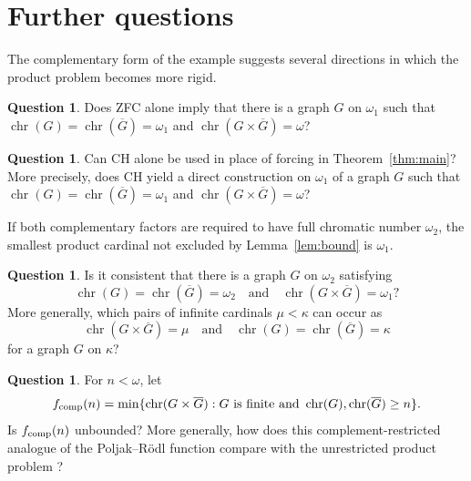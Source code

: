 \documentclass[10pt,a4paper]{amsart}
\numberwithin{equation}{section}
\theoremstyle{definition}
\newtheorem{question}[theorem]{Question}
\theoremstyle{remark}
\newcommand{\chr}{\operatorname{chr}}
\begin{document}
\iffalse
\section{Further questions}

The complementary form of the example suggests several directions in
which the product problem becomes more rigid.

\begin{question}
Does ZFC alone imply that there is a graph $G$ on $\omega_1$ such that
$\chr(G)=\chr(\overline G)=\omega_1$ and
$\chr(G\times\overline G)=\omega$?
\end{question}

\begin{question}
Can CH alone be used in place of forcing in
Theorem~\ref{thm:main}?  More precisely, does CH yield a direct
construction on $\omega_1$ of a graph $G$ such that
$\chr(G)=\chr(\overline G)=\omega_1$ and
$\chr(G\times\overline G)=\omega$?
\end{question}

If both complementary factors are required to have full chromatic
number $\omega_2$, the smallest product cardinal not excluded by
Lemma~\ref{lem:bound} is $\omega_1$.

\begin{question}\label{q:omega2}
Is it consistent that there is a graph $G$ on $\omega_2$ satisfying
\begin{displaymath}
 \chr(G)=\chr(\overline G)=\omega_2
 \quad\text{and}\quad
 \chr(G\times\overline G)=\omega_1?
\end{displaymath}
More generally, which pairs of infinite cardinals $\mu<\kappa$ can
occur as
\begin{displaymath}
 \chr(G\times\overline G)=\mu
 \quad\text{and}\quad
 \chr(G)=\chr(\overline G)=\kappa
\end{displaymath}
for a graph $G$ on $\kappa$?
\end{question}

\begin{question}
For $n<\omega$, let
\begin{displaymath}
 f_{\rm comp}(n)=
 \min\{\chr(G\times\overline G):G\text{ is finite and }
          \chr(G),\chr(\overline G)\geq n\}.
\end{displaymath}
Is $f_{\rm comp}(n)$ unbounded?  More generally, how does this
complement-restricted analogue of the Poljak--R\"odl function compare
with the unrestricted product problem \cite{PoljakRodl1981}?
\end{question}
\end{document}
